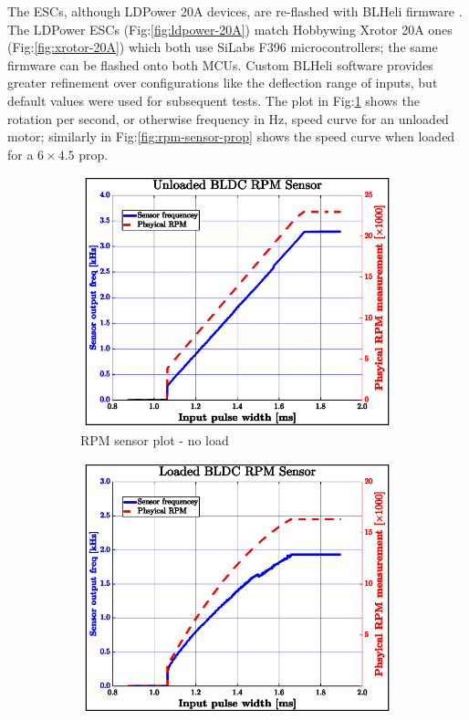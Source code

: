 \par
The ESCs, although LDPower 20A devices, are re-flashed with BLHeli firmware \cite{BLHeli}. The LDPower ESCs (Fig:\ref{fig:ldpower-20A}) match Hobbywing Xrotor 20A ones (Fig:\ref{fig:xrotor-20A}) which both use SiLabs F396 microcontrollers; the same firmware can be flashed onto both MCUs. Custom BLHeli software provides greater refinement over configurations like the deflection range of inputs, but default values were used for subsequent tests. The plot in Fig:\ref{fig:rpm-sensor-noload} shows the rotation per second, or otherwise frequency in Hz, speed curve for an unloaded motor; similarly in Fig:\ref{fig:rpm-sensor-prop} shows the speed curve when loaded for a $6\times 4.5$ prop. 
\begin{figure}[htbp]
\begin{subfigure}{0.5\textwidth}
\centering
\includegraphics[width=\textwidth]{graphs/rpm-sensor-noload}
\caption{RPM sensor plot - no load}
\label{fig:rpm-sensor-noload}
\end{subfigure}
\begin{subfigure}{0.5\textwidth}
\centering
\includegraphics[width=\textwidth]{graphs/rpm-sensor-prop}

\end{subfigure}
\end{figure}
